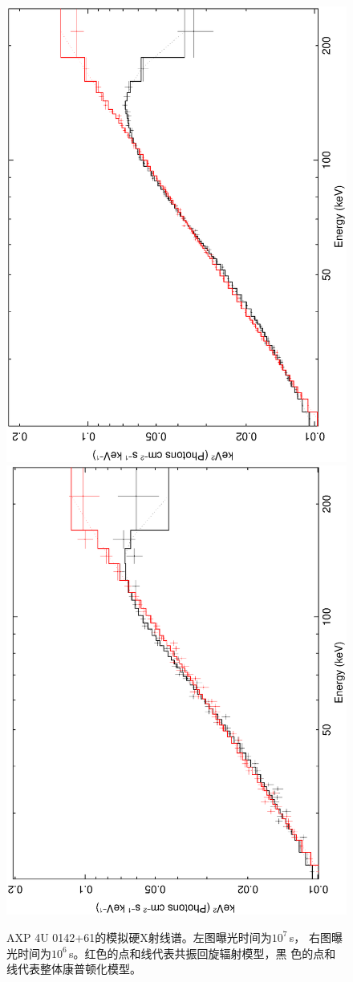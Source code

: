 \begin{figure}
\begin{center}
\includegraphics[width=2 in,angle=-90]{10ms_comptb_po.ps}
\includegraphics[width=2 in,angle=-90]{1ms_comptb_po.ps}
\caption{AXP 4U 0142+61的模拟硬X射线谱。左图曝光时间为$10^7$\,s，
右图曝光时间为$10^6$\,s。红色的点和线代表共振回旋辐射模型，黑
色的点和线代表整体康普顿化模型。}
\label{10ms}
\end{center}
\end{figure}

